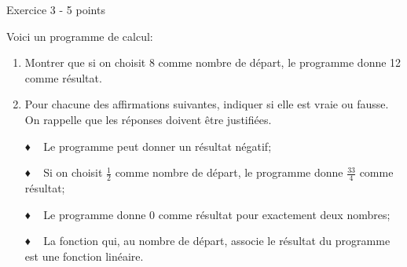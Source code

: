 
%
\begin{h2}Exercice 3 - 5 points\end{h2}
Voici un programme de calcul:

\begin{center}
\end{center}
\begin{enumerate}
     \item
     Montrer que si on choisit 8 comme nombre de départ, le programme donne 12 comme résultat.
     \item
     Pour chacune des affirmations suivantes, indiquer si elle est vraie ou fausse. On rappelle que les réponses doivent être justifiées.
     \par
     ♦    Le programme peut donner un résultat négatif;
     \par
     ♦     Si on choisit $\frac{1}{2}$ comme nombre de départ, le programme donne $\frac{33}{4}$ comme résultat;
     \par
     ♦     Le programme donne 0 comme résultat pour exactement deux nombres;
     \par
     ♦     La fonction qui, au nombre de départ, associe le résultat du programme est une fonction linéaire.
\end{enumerate}
